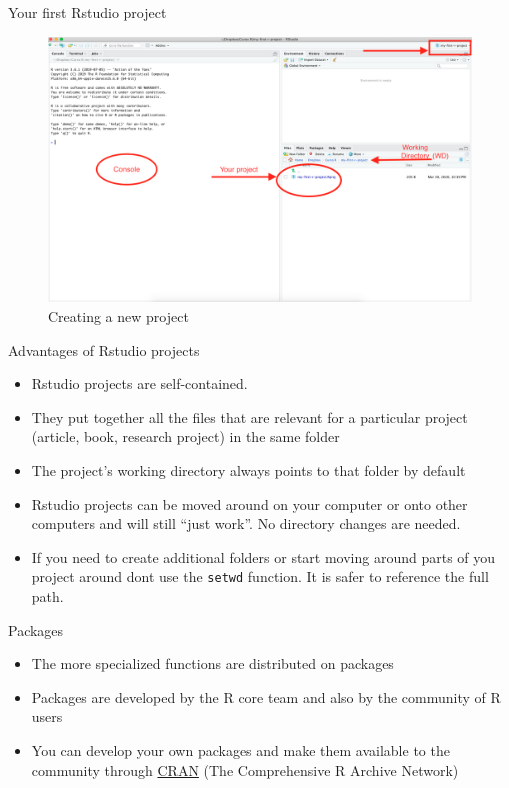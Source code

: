 \documentclass[ignorenonframetext,]{beamer}
\begin{document}
\begin{frame}{Your first Rstudio project}
\protect\hypertarget{your-first-rstudio-project-5}{}

\begin{figure}
\includegraphics[scale=0.19]{figures/environment}
\caption{Creating a new project}
\end{figure}

\end{frame}

\begin{frame}[fragile]{Advantages of Rstudio projects}
\protect\hypertarget{advantages-of-rstudio-projects}{}

\begin{itemize}
\item
  Rstudio projects are self-contained.
\item
  They put together all the files that are relevant for a particular
  project (article, book, research project) in the same folder
\item
  The project's working directory always points to that folder by
  default
\item
  Rstudio projects can be moved around on your computer or onto other
  computers and will still ``just work''. No directory changes are
  needed.
\item
  If you need to create additional folders or start moving around parts
  of you project around dont use the \texttt{setwd} function. It is
  safer to reference the full path.
\end{itemize}

\end{frame}

\begin{frame}{Packages}
\protect\hypertarget{packages}{}

\begin{itemize}
\item
  The more specialized functions are distributed on packages
\item
  Packages are developed by the R core team and also by the community of
  R users
\item
  You can develop your own packages and make them available to the
  community through \href{https://cran.r-project.org}{CRAN} (The
  Comprehensive R Archive Network)
\end{itemize}

\end{frame}
\end{document}
